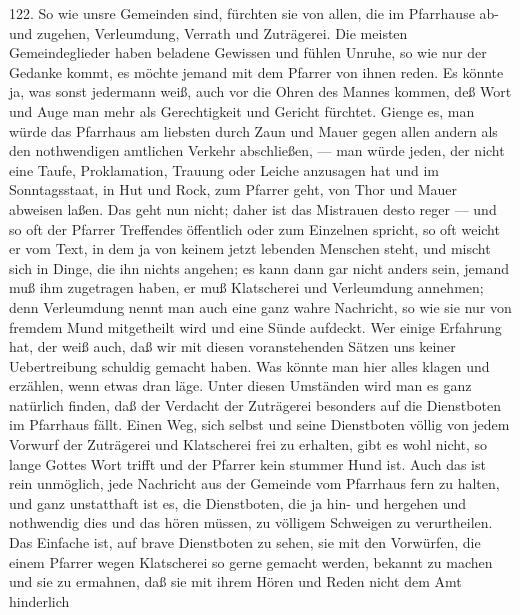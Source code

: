 122. So wie unsre Gemeinden sind, fürchten sie von allen, die im Pfarrhause ab- und zugehen, Verleumdung, Verrath und Zuträgerei. Die meisten Gemeindeglieder haben beladene Gewissen und fühlen Unruhe, so wie nur der Gedanke kommt, es möchte jemand mit dem Pfarrer von ihnen reden. Es könnte ja, was sonst jedermann weiß, auch vor die Ohren des Mannes kommen, deß Wort und Auge man mehr als Gerechtigkeit und Gericht fürchtet. Gienge es, man würde das Pfarrhaus am liebsten durch Zaun und Mauer gegen allen andern als den nothwendigen amtlichen Verkehr abschließen, — man würde jeden, der nicht eine Taufe, Proklamation, Trauung oder Leiche anzusagen hat und im Sonntagsstaat, in Hut und
Rock, zum Pfarrer geht, von Thor und Mauer abweisen laßen. Das geht nun nicht; daher ist das Mistrauen desto reger — und so oft der Pfarrer Treffendes öffentlich oder zum Einzelnen spricht, so oft weicht er vom Text, in dem ja von keinem jetzt lebenden Menschen steht, und mischt sich in Dinge, die ihn nichts angehen; es kann dann gar nicht anders sein, jemand muß ihm zugetragen haben, er muß Klatscherei und Verleumdung annehmen; denn Verleumdung nennt man auch eine ganz wahre Nachricht, so wie sie nur von fremdem Mund mitgetheilt wird und eine Sünde aufdeckt. Wer einige Erfahrung hat, der weiß auch, daß wir mit diesen voranstehenden Sätzen uns keiner Uebertreibung schuldig gemacht haben. Was könnte man hier alles klagen und erzählen, wenn etwas dran läge. Unter diesen Umständen wird man es ganz natürlich finden, daß der Verdacht der Zuträgerei besonders auf die Dienstboten im Pfarrhaus fällt. Einen Weg, sich selbst und seine Dienstboten völlig von jedem Vorwurf der Zuträgerei und Klatscherei frei zu erhalten, gibt es wohl nicht, so lange Gottes Wort trifft und der Pfarrer kein stummer Hund ist. Auch das ist rein unmöglich, jede Nachricht aus der Gemeinde vom Pfarrhaus fern zu halten, und ganz unstatthaft ist es, die Dienstboten, die ja hin- und hergehen und nothwendig dies und das hören müssen, zu völligem Schweigen zu verurtheilen. Das Einfache ist, auf brave Dienstboten zu sehen, sie mit den Vorwürfen, die einem Pfarrer wegen Klatscherei so gerne gemacht werden, bekannt zu machen und sie zu ermahnen, daß sie mit ihrem Hören und Reden nicht dem Amt hinderlich
